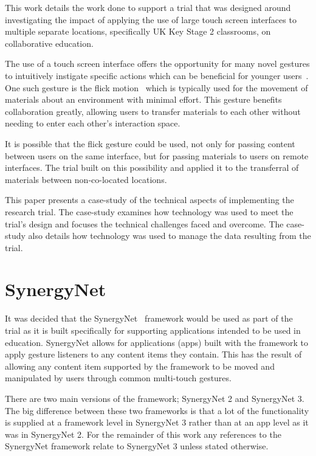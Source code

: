 \documentclass[a4paper,11pt]{article}
\begin{document}
This work details the work done to support a trial that was designed around investigating the impact of applying the use of large touch screen interfaces to multiple separate locations, specifically UK Key Stage 2 classrooms, on collaborative education.

The use of a touch screen interface offers the opportunity for many novel gestures to intuitively instigate specific actions which can be beneficial for younger users~\cite{kim:2007,wu:2003,rick:2009}.
One such gesture is the flick motion~\cite{reetz-et-al:2006} which is typically used for the movement of materials about an environment with minimal effort.
This gesture benefits collaboration greatly, allowing users to transfer materials to each other without needing to enter each other's interaction space.
 
It is possible that the flick gesture could be used, not only for passing content between users on the same interface, but for passing materials to users on remote interfaces.
The trial built on this possibility and applied it to the transferral of materials between non-co-located locations.

This paper presents a case-study of the technical aspects of implementing the research trial.
The case-study examines how technology was used to meet the trial's design and focuses the technical challenges faced and overcome.
The case-study also details how technology was used to manage the data resulting from the trial.


\section{SynergyNet}

It was decided that the SynergyNet~\cite{alagha-et-al:2010,higgins-et-al:2011} framework would be used as part of the trial as it is built specifically for supporting applications intended to be used in education.
SynergyNet allows for applications (apps) built with the framework to apply gesture listeners to any content items they contain.
This has the result of allowing any content item supported by the framework to be moved and manipulated by users through common multi-touch gestures.

There are two main versions of the framework; SynergyNet 2 and SynergyNet 3.
The big difference between these two frameworks is that a lot of the functionality is supplied at a framework level in SynergyNet 3 rather than at an app level as it was in SynergyNet 2.
For the remainder of this work any references to the SynergyNet framework relate to SynergyNet 3 unless stated otherwise.
\end{document}
